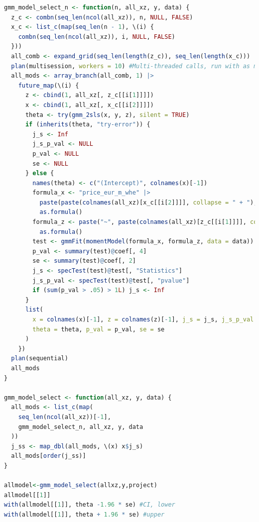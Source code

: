 \documentclass[12pt]{article}
\begin{document}
\begin{lstlisting}[language=R]
gmm_model_select_n <- function(n, all_xz, y, data) {
  z_c <- combn(seq_len(ncol(all_xz)), n, NULL, FALSE)
  x_c <- list_c(map(seq_len(n - 1), \(i) {
    combn(seq_len(ncol(all_xz)), i, NULL, FALSE)
  }))
  all_comb <- expand_grid(seq_len(length(z_c)), seq_len(length(x_c)))
  plan(multisession, workers = 10) #Multi-threaded calls, run with as many cores as the computer needs, my test computer is a ten core cpu, so = 10
  all_mods <- array_branch(all_comb, 1) |>
    future_map(\(i) {
      z <- cbind(1, all_xz[, z_c[[i[1]]]])
      x <- cbind(1, all_xz[, x_c[[i[2]]]])
      theta <- try(gmm_2sls(x, y, z), silent = TRUE)
      if (inherits(theta, "try-error")) {
        j_s <- Inf
        j_s_p_val <- NULL
        p_val <- NULL
        se <- NULL
      } else {
        names(theta) <- c("(Intercept)", colnames(x)[-1])
        formula_x <- "price_eur_m_whe" |>
          paste(paste(colnames(all_xz)[x_c[[i[2]]]], collapse = " + "), sep = " ~ ") |>
          as.formula()
        formula_z <- paste("~", paste(colnames(all_xz)[z_c[[i[1]]]], collapse = " + ")) |>
          as.formula()
        test <- gmmFit(momentModel(formula_x, formula_z, data = data))
        p_val <- summary(test)@coef[, 4]
        se <- summary(test)@coef[, 2]
        j_s <- specTest(test)@test[, "Statistics"]
        j_s_p_val <- specTest(test)@test[, "pvalue"]
        if (sum(p_val > .05) > 1L) j_s <- Inf
      }
      list(
        x = colnames(x)[-1], z = colnames(z)[-1], j_s = j_s, j_s_p_val = j_s_p_val,
        theta = theta, p_val = p_val, se = se
      )
    })
  plan(sequential)
  all_mods
}

gmm_model_select <- function(all_xz, y, data) {
  all_mods <- list_c(map(
    seq_len(ncol(all_xz))[-1],
    gmm_model_select_n, all_xz, y, data
  ))
  j_ss <- map_dbl(all_mods, \(x) x$j_s)
  all_mods[order(j_ss)]
}

allmodel<-gmm_model_select(allxz,y,project)
allmodel[[1]]
with(allmodel[[1]], theta -1.96 * se) #CI, lower
with(allmodel[[1]], theta + 1.96 * se) #upper

\end{lstlisting}
\end{document}
